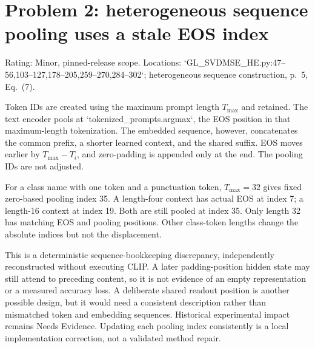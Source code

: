 \documentclass[10pt]{article}
\begin{document}
\section*{Problem 2: heterogeneous sequence pooling uses a stale EOS index}
Rating: Minor, pinned-release scope. Locations: `GL\_SVDMSE\_HE.py:47--56,103--127,178--205,259--270,284--302`; heterogeneous sequence construction, p. 5, Eq. (7).\par
Token IDs are created using the maximum prompt length \(T_{\max}\) and retained. The text encoder pools at `tokenized\_prompts.argmax`, the EOS position in that maximum-length tokenization. The embedded sequence, however, concatenates the common prefix, a shorter learned context, and the shared suffix. EOS moves earlier by \(T_{\max}-T_i\), and zero-padding is appended only at the end. The pooling IDs are not adjusted.\par
For a class name with one token and a punctuation token, \(T_{\max}=32\) gives fixed zero-based pooling index 35. A length-four context has actual EOS at index 7; a length-16 context at index 19. Both are still pooled at index 35. Only length 32 has matching EOS and pooling positions. Other class-token lengths change the absolute indices but not the displacement.\par
This is a deterministic sequence-bookkeeping discrepancy, independently reconstructed without executing CLIP. A later padding-position hidden state may still attend to preceding content, so it is not evidence of an empty representation or a measured accuracy loss. A deliberate shared readout position is another possible design, but it would need a consistent description rather than mismatched token and embedding sequences. Historical experimental impact remains Needs Evidence. Updating each pooling index consistently is a local implementation correction, not a validated method repair.\par
\end{document}
